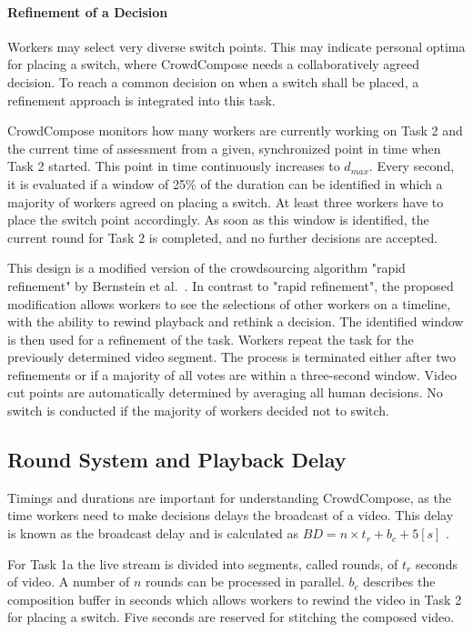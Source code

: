 \paragraph{Refinement of a Decision}
Workers may select very diverse switch points.
This may indicate personal optima for placing a switch, where CrowdCompose needs a collaboratively agreed decision.
To reach a common decision on when a switch shall be placed, a refinement approach is integrated into this task.

CrowdCompose monitors how many workers are currently working on Task 2 and the current time of assessment from a given, synchronized point in time when Task 2 started.
This point in time continuously increases to $d_{max}$.
Every second, it is evaluated if a window of 25\% of the duration can be identified in which a majority of workers agreed on placing a switch.
At least three workers have to place the switch point accordingly.
As soon as this window is identified, the current round for Task 2 is completed, and no further decisions are accepted.

This design is a modified version of the crowdsourcing algorithm "rapid refinement" by Bernstein et al.~\cite{Bernstein2011}. 
In contrast to "rapid refinement", the proposed modification allows workers to see the selections of other workers on a timeline, with the ability to rewind playback and rethink a decision. 
The identified window is then used for a refinement of the task.
Workers repeat the task for the previously determined video segment.
The process is terminated either after two refinements or if a majority of all votes are within a three-second window. 
Video cut points are automatically determined by averaging all human decisions.
No switch is conducted if the majority of workers decided not to switch.
\subsection{Round System and Playback Delay}
Timings and durations are important for understanding CrowdCompose, as the time workers need to make decisions delays the broadcast of a video. 
This delay is known as the broadcast delay and is calculated as $BD = n \times t_{r} + b_c + 5 [s]$ . 

For Task 1a the live stream is divided into segments, called rounds, of $t_{r}$ seconds of video. 
A number of $n$ rounds can be processed in parallel. 
$b_c$ describes the composition buffer in seconds which allows workers to rewind the video in Task 2 for placing a switch. 
Five seconds are reserved for stitching the composed video. 

